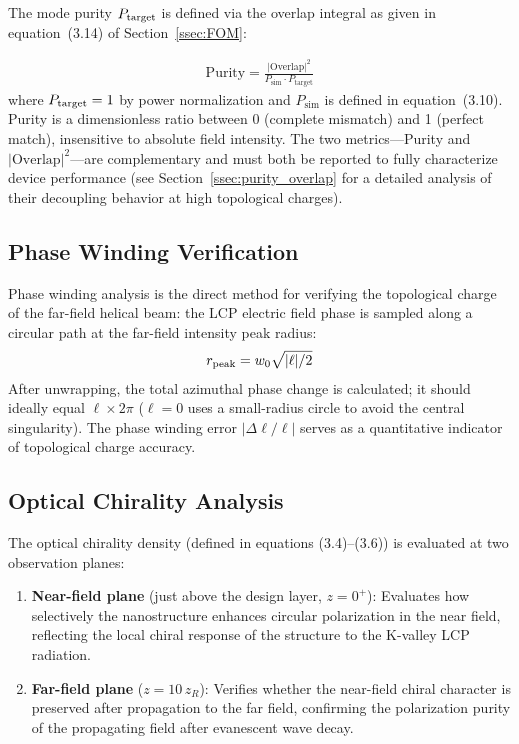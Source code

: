 The mode purity $P_{\rm target}$ is defined via the overlap integral as given in equation~(3.14) of Section~\ref{ssec:FOM}:

\begin{align}
\text{Purity} = \frac{|\text{Overlap}|^2}{P_{\text{sim}}\cdot P_{\text{target}}}
\end{align}
where $P_{\rm target} = 1$ by power normalization and $P_{\text{sim}}$ is defined in equation~(3.10). Purity is a dimensionless ratio between 0 (complete mismatch) and 1 (perfect match), insensitive to absolute field intensity. The two metrics---Purity and $|\text{Overlap}|^2$---are complementary and must both be reported to fully characterize device performance (see Section~\ref{ssec:purity_overlap} for a detailed analysis of their decoupling behavior at high topological charges).

\subsection{Phase Winding Verification}

Phase winding analysis is the direct method for verifying the topological charge of the far-field helical beam: the LCP electric field phase is sampled along a circular path at the far-field intensity peak radius:
\begin{align}
r_{\rm peak} = w_0\sqrt{|\ell|/2}
\end{align}
After unwrapping, the total azimuthal phase change is calculated; it should ideally equal $\ell \times 2\pi$ ($\ell = 0$ uses a small-radius circle to avoid the central singularity). The phase winding error $|\Delta\ell/\ell|$ serves as a quantitative indicator of topological charge accuracy.

\subsection{Optical Chirality Analysis}

\label{ssec:chirality_analysis}

The optical chirality density (defined in equations (3.4)--(3.6)) is evaluated at two observation planes:

\begin{enumerate}
  \item \textbf{Near-field plane} (just above the design layer, $z = 0^+$): Evaluates how selectively the nanostructure enhances circular polarization in the near field, reflecting the local chiral response of the structure to the K-valley LCP radiation.
  \item \textbf{Far-field plane} ($z = 10\,z_R$): Verifies whether the near-field chiral character is preserved after propagation to the far field, confirming the polarization purity of the propagating field after evanescent wave decay.
\end{enumerate}

